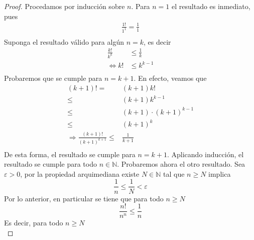 \documentclass[12pt]{article}
\begin{document}
\begin{enumerate}
        \begin{proof}
            Procedamos por inducción sobre $n$. Para $n=1$ el resultado es inmediato, pues
            \begin{equation*}
                \begin{split}
                    \frac{1!}{1^1}=\frac{1}{1}\\
                \end{split}
            \end{equation*}
            Suponga el resultado válido para algún $n=k$, es decir
            \begin{equation*}
                \begin{split}
                    \frac{k!}{k^k}&\leq\frac{1}{k}\\
                    \iff k!&\leq k^{k-1}\\
                \end{split}
            \end{equation*}
            Probaremos que se cumple para $n=k+1$. En efecto, veamos que
            \begin{equation*}
                \begin{split}
                    (k+1)!=&(k+1)k!\\
                    \leq&(k+1)k^{k-1}\\
                    \leq&(k+1)\cdot(k+1)^{k-1}\\
                    \leq&(k+1)^k\\
                    \Rightarrow \frac{(k+1)!}{(k+1)^{k+1}}\leq&\frac{1}{k+1}\\
                \end{split}
            \end{equation*}
            De esta forma, el resultado se cumple para $n=k+1$. Aplicando inducción, el resultado se cumple para todo $n\in\mathbb{N}$. Probaremos ahora el otro resultado. Sea $\varepsilon>0$, por la propiedad arquimediana existe $N\in\mathbb{N}$ tal que $n\geq N$ implica
            \begin{equation*}
                \frac{1}{n}\leq\frac{1}{N}<\varepsilon
            \end{equation*}
            Por lo anterior, en particular se tiene que para todo $n\geq N$
            \begin{equation*}
                \frac{n!}{n^n}\leq\frac{1}{n}
            \end{equation*}
            Es decir, para todo $n\geq N$
            \begin{equation*}

\end{equation*}
\end{proof}
\end{enumerate}
\end{document}
